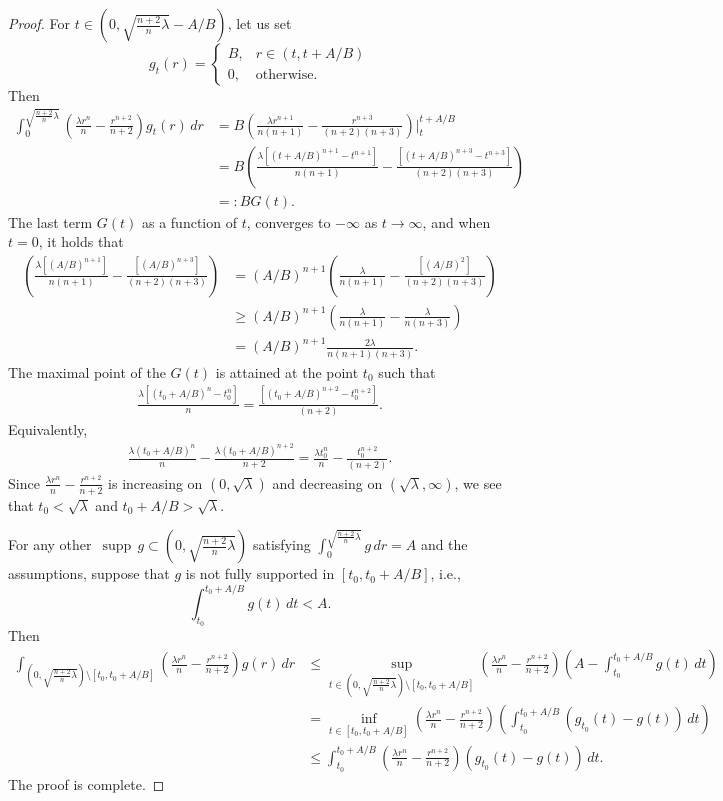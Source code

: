 \documentclass[10pt,a4paper]{amsart}
\def\supp{{\mathop\mathrm{\,supp\,}}}
\begin{document}
\begin{proof}
For $t\in (0,\sqrt{\frac{n+2}{n}\lambda}-A/B )$, let us set
$$g_t(r)=
\begin{cases}
B, & r\in (t,t+A/B)\\
0, & \mbox{otherwise}.
\end{cases}
$$
Then
\begin{align*}
\int_0^{\sqrt{\frac{n+2}{n}\lambda}} \left(\frac{\lambda r^n}{n} -\frac{r^{n+2}}{n+2}\right)g_t(r)\,dr&=B\left(\frac{\lambda r^{n+1}}{n(n+1)}-\frac{r^{n+3}}{(n+2)(n+3)}\right)\bigg|_{t}^{t+A/B}\\
&=B\left(\frac{\lambda \left[(t+A/B)^{n+1}-t^{n+1}\right]}{n(n+1)}-\frac{\left[(t+A/B)^{n+3}-t^{n+3}\right]}{(n+2)(n+3)}\right)\\
&=:B G(t).
\end{align*}
The last term $G(t)$ as a function of $t$, converges to $-\infty$ as $t\to\infty$, and when $t=0$, it holds that
\begin{align*}
\left(\frac{\lambda \left[(A/B)^{n+1}\right]}{n(n+1)}-\frac{\left[(A/B)^{n+3}\right]}{(n+2)(n+3)}\right)& =(A/B)^{n+1} \left(\frac{\lambda }{n(n+1)}-\frac{\left[(A/B)^{2}\right]}{(n+2)(n+3)}\right)\\
&\ge (A/B)^{n+1} \left(\frac{\lambda }{n(n+1)}-\frac{\lambda}{n(n+3)}\right)\\
&= (A/B)^{n+1} \frac{2\lambda }{n(n+1)(n+3)}.
\end{align*}
The maximal point of the $G(t)$ is attained at the point $t_0$ such that
\begin{align*}
\frac{\lambda \left[(t_0+A/B)^{n}-t_0^{n}\right]}{n}=\frac{\left[(t_0+A/B)^{n+2}-t_0^{n+2}\right]}{(n+2)}.
\end{align*}
Equivalently,
\begin{align*}
\frac{\lambda(t_0+A/B)^{n}}{n}-\frac{\lambda(t_0+A/B)^{n+2}}{n+2} =\frac{\lambda t_0^{n}}{n}-\frac{t_0^{n+2}}{(n+2)}.
\end{align*}
Since $\frac{\lambda r^n}{n} -\frac{r^{n+2}}{n+2}$ is increasing on $(0,\sqrt\lambda)$ and decreasing on $(\sqrt\lambda,\infty)$, we see that
$t_0<\sqrt\lambda$ and $t_0+A/B>\sqrt{\lambda}$.


For any other $\supp g\subset (0,\sqrt{\frac{n+2}{n}\lambda})$ satisfying $\int_0^{\sqrt{\frac{n+2}{n}\lambda}} g\,dr=A$ and the assumptions,
suppose that $g$ is not fully supported in $[t_0,t_0+A/B]$, i.e.,
$$\int_{t_0}^{t_0+A/B} g(t)\,dt<A.$$
Then
\begin{align*}
\int_{(0,\sqrt{\frac{n+2}{n}\lambda})\setminus [t_0,t_0+A/B]} \left(\frac{\lambda r^n}{n} -\frac{r^{n+2}}{n+2}\right)g(r)\,dr&\le
\sup_{t\in (0,\sqrt{\frac{n+2}{n}\lambda})\setminus [t_0,t_0+A/B]}\left(\frac{\lambda r^n}{n} -\frac{r^{n+2}}{n+2}\right) \left(A-\int_{t_0}^{t_0+A/B} g(t)\,dt\right) \\
&=\inf_{t\in [t_0,t_0+A/B]}\left(\frac{\lambda r^n}{n} -\frac{r^{n+2}}{n+2}\right) \left(\int_{t_0}^{t_0+A/B} \left(g_{t_0}(t)-g(t)\right)\,dt\right)\\
&\le \int_{t_0}^{t_0+A/B} \left(\frac{\lambda r^n}{n} -\frac{r^{n+2}}{n+2}\right)\left(g_{t_0}(t)-g(t)\right)\,dt.
\end{align*}
The proof is complete.
\end{proof}
\end{document}
